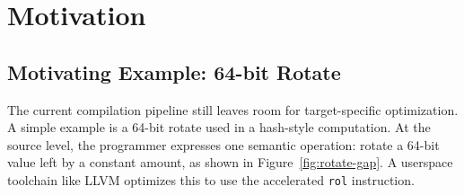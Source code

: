 



\section{Motivation}
\label{sec:motivation}



\subsection{Motivating Example: 64-bit Rotate}
\label{subsec:example}

The current compilation pipeline still leaves room for target-specific optimization. A simple example is a 64-bit rotate used in a hash-style computation. At the source level, the programmer expresses one semantic operation: rotate a 64-bit value left by a constant amount, as shown in Figure~\ref{fig:rotate-gap}. A userspace toolchain like LLVM optimizes this to use the accelerated \texttt{rol} instruction.

